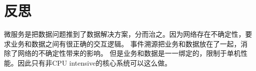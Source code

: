 \chapter{反思}

微服务是把数据问题推到了数据解决方案，分而治之。因为网络存在不确定性，要求业务和数据之间有很正确的交互逻辑。
事件溯源把业务和数据放在了一起，消除了网络的不确定性带来的影响。
但是业务和数据是一一绑定的，限制于单机性能。因此只有非CPU intensive的核心系统可以这么做。


